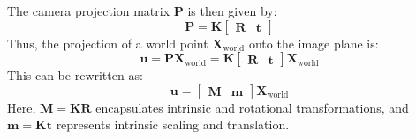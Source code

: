 The camera projection matrix $\mathbf{P}$ is then given by:
\[\mathbf{P} = \mathbf{K} \begin{bmatrix} \mathbf{R} & \mathbf{t} \end{bmatrix}\]
Thus, the projection of a world point $\mathbf{X}_\text{world}$ onto the image plane is:
\[\mathbf{u} = \mathbf{P} \mathbf{X}_\text{world} = \mathbf{K} \begin{bmatrix} \mathbf{R} & \mathbf{t} \end{bmatrix} \mathbf{X}_\text{world}\]
This can be rewritten as:
\[\mathbf{u} = \begin{bmatrix} \mathbf{M} & \mathbf{m}\end{bmatrix}    \mathbf{X}_\text{world} \]
Here, $\mathbf{M} = \mathbf{K} \mathbf{R}$ encapsulates intrinsic and rotational transformations, and $\mathbf{m} = \mathbf{K} \mathbf{t}$ represents intrinsic scaling and translation.